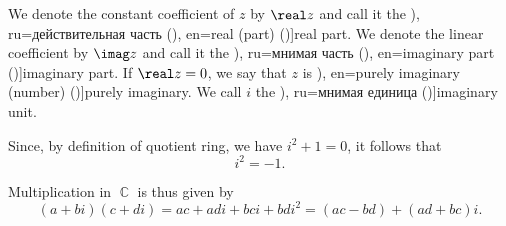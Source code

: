 \begin{definition}
  We denote the constant coefficient of \( z \) by \( \real z \) and call it the \term[bg=реална част (\cite[296]{ИлинСадовничиСендов1984АнализТом1}), ru=действительная часть (\cite[12]{Маркушевич1967АналитическиеФункцииТом1}), en=real (part) (\cite[1]{Ahlfors1979ComplexAnalysis})]{real part}. We denote the linear coefficient by \( \imag z \) and call it the \term[bg=имагинерна част (\cite[296]{ИлинСадовничиСендов1984АнализТом1}), ru=мнимая часть (\cite[12]{Маркушевич1967АналитическиеФункцииТом1}), en=imaginary part (\cite[1]{Ahlfors1979ComplexAnalysis})]{imaginary part}. If \( \real z = 0 \), we say that \( z \) is \term[ru=чисто мнимое (число) (\cite[12]{Маркушевич1967АналитическиеФункцииТом1}), en=purely imaginary (number) (\cite[1]{Ahlfors1979ComplexAnalysis})]{purely imaginary}. We call \( i \) the \term[en=imaginary unit (\cite[1]{Ahlfors1979ComplexAnalysis}), ru=мнимая единица (\cite[12]{Маркушевич1967АналитическиеФункцииТом1})]{imaginary unit}.

  Since, by definition of quotient ring, we have \( i^2 + 1 = 0 \), it follows that
  \begin{equation}\label{eq:def:complex_numbers/i_square}
    i^2 = -1.
  \end{equation}

  Multiplication in \( \BbbC \) is thus given by
  \begin{equation}\label{eq:def:complex_numbers/multiplication}
    (a + bi) (c + di) = ac + adi + bci + bdi^2 = (ac - bd) + (ad + bc) i.
  \end{equation}
\end{definition}
